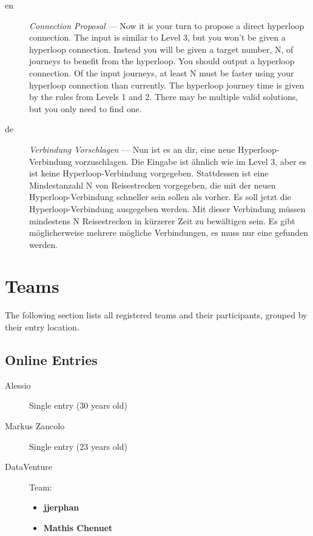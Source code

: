 \documentclass[a4paper,11pt]{article}
\begin{document}
\begin{description} %
  \item[en] \emph{Connection Proposal} --- 
    Now it is your turn to propose a direct hyperloop connection.
    The input is similar to Level 3, but you won’t be given a hyperloop connection.
    Instead you will be given a target number, N, of journeys to benefit from the
    hyperloop.
    You should output a hyperloop connection. Of the input journeys, at least N
    must be faster using your hyperloop connection than currently. The hyperloop
    journey time is given by the rules from Levels 1 and 2. There may be multiple
    valid solutions, but you only need to find one.
  
  \item[de] \emph{Verbindung Vorschlagen} --- 
    Nun ist es an dir, eine neue Hyperloop-Verbindung vorzuschlagen.
    Die Eingabe ist ähnlich wie im Level 3, aber es ist keine Hyperloop-Verbindung
    vorgegeben. Stattdessen ist eine Mindestanzahl N von Reisestrecken vorgegeben,
    die mit der neuen Hyperloop-Verbindung schneller sein sollen als vorher.
    Es soll jetzt die Hyperloop-Verbindung ausgegeben werden. Mit dieser Verbindung
    müssen mindestens N Reisestrecken in kürzerer Zeit zu bewältigen sein. Es gibt
    möglicherweise mehrere mögliche Verbindungen, es muss nur eine gefunden werden.
  
\end{description}


\section{Teams}

The following section lists all registered teams and their participants, grouped by their entry location.

\subsection{Online Entries}

\begin{description}
  \item[Alessio]
    Single entry (30 years old)
  \item[Markus Zancolo]
    Single entry (23 years old)
  \item[DataVenture]
    Team:
    \begin{itemize}
      \item \textbf{jjerphan} 
      \item \textbf{Mathis Chenuet} 
    \end{itemize}
\end{description}
\end{document}
